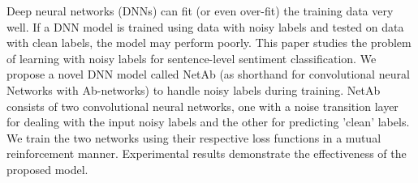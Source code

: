 Deep neural networks (DNNs) can fit (or even over-fit) the training data very well. If a DNN model is trained using data with noisy labels and tested on data with clean labels, the model may perform poorly. This paper studies the problem of learning with noisy labels for sentence-level sentiment classification. We propose a novel DNN model called NetAb (as shorthand for convolutional neural Networks with Ab-networks) to handle noisy labels during training. NetAb consists of two convolutional neural networks, one with a noise transition layer for dealing with the input noisy labels and the other for predicting 'clean' labels. We train the two networks using their respective loss functions in a mutual reinforcement manner. Experimental results demonstrate the effectiveness of the proposed model.
